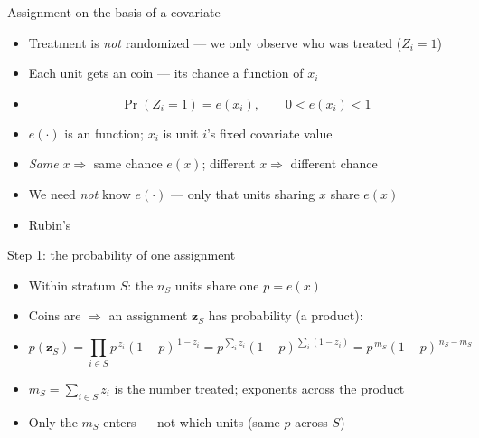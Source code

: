 \documentclass[table, xcolor = {dvipsnames}, 9pt]{beamer}
\theoremstyle{plain}
\newcommand{\mh}[1]{{\color{magenta}{#1}}}
\begin{document}
\begin{frame}[t]{Assignment on the basis of a covariate}
\vfill
\begin{itemize} \vfill
\item Treatment is \emph{not} randomized --- we only observe who was treated ($Z_i = 1$) \vfill
\item Each unit gets an \mh{independent} coin --- its chance a function of $x_i$ \vfill
\item[]
\begin{equation*}
\Pr\!\left(Z_i = 1\right) = e(x_i), \qquad 0 < e(x_i) < 1
\end{equation*} \vfill
\item $e(\cdot)$ is an \mh{arbitrary} function; $x_i$ is unit $i$'s fixed covariate value \vfill
\item \emph{Same} $x \Rightarrow$ same chance $e(x)$; different $x \Rightarrow$ different chance \vfill
\item We need \emph{not} know $e(\cdot)$ --- only that units sharing $x$ share $e(x)$ \vfill
\item Rubin's \mh{assignment on the basis of a covariate} \citep{rubin1977} \vfill
\end{itemize} \vfill
\end{frame}
\begin{frame}[t]{Step 1: the probability of one assignment}
\vfill
\begin{itemize} \vfill
\item Within stratum $S$: the $n_S$ units share one $p = e(x)$ \vfill
\item Coins are \mh{independent} $\Rightarrow$ an assignment $\bm{z}_S$ has probability (a product): \vfill
\item[]
\begin{equation*}
p(\bm{z}_S) = \prod_{i \in S} p^{\,z_i}(1-p)^{\,1 - z_i} = p^{\sum_i z_i}(1-p)^{\sum_i (1 - z_i)} = p^{\,m_S}(1-p)^{\,n_S - m_S}
\end{equation*} \vfill
\item $m_S = \sum_{i \in S} z_i$ is the number treated; exponents \mh{add} across the product \vfill
\item Only the \mh{count} $m_S$ enters --- not which units (same $p$ across $S$) \vfill
\end{itemize} \vfill
\end{frame}
\end{document}
